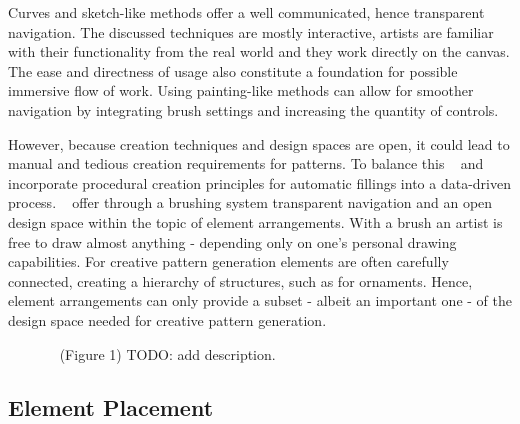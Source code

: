 Curves and sketch-like methods offer a well communicated, hence transparent navigation. The discussed techniques are mostly interactive, artists are familiar with their functionality from the real world and they work directly on the canvas. The ease and directness of usage also constitute a foundation for possible immersive flow of work. Using painting-like methods can allow for smoother navigation by integrating brush settings and increasing the quantity of controls.

However, because creation techniques and design spaces are open, it could lead to manual and tedious creation requirements for patterns. To balance this \citeauthor*{kazi_2012_vit}~\cite{kazi_2012_vit} and \citeauthor*{xing_2014_apr}~\cite{xing_2014_apr} incorporate procedural creation principles for automatic fillings into a data-driven process. \citeauthor*{hsu_2020_aef}~\cite{hsu_2020_aef} offer through a brushing system transparent navigation and an open design space within the topic of element arrangements. With a brush an artist is free to draw almost anything - depending only on one's personal drawing capabilities. For creative pattern generation elements are often carefully connected, creating a hierarchy of structures, such as for ornaments. Hence, element arrangements can only provide a subset - albeit an important one - of the design space needed for creative pattern generation. 

\begin{figure}[H]
    \centering
    \label{fig:xing_2014_apr}
    \caption{\citeauthor*{xing_2014_apr}~\cite{xing_2014_apr} (Figure 1) TODO: add description. \color{red}{Status rights: not started.}}
\end{figure}

\subsection{Element Placement}
\label{subsubsec:analysis_creative_means_elements}

